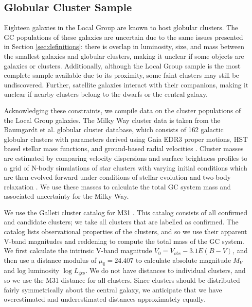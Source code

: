 \documentclass[twocolumn]{aastex631}
\begin{document}
\subsection{Globular Cluster Sample} \label{subsec:sample_clusters}

Eighteen galaxies in the Local Group are known to host globular clusters. The GC populations of these galaxies are uncertain due to the same issues presented in Section \ref{sec:definitions}: there is overlap in luminosity, size, and mass between the smallest galaxies and globular clusters, making it unclear if some objects are galaxies or clusters. Additionally, although the Local Group sample is the most complete sample available due to its proximity, some faint clusters may still be undiscovered. Further, satellite galaxies interact with their companions, making it unclear if nearby clusters belong to the dwarfs or the central galaxy.

Acknowledging these constraints, we compile data on the cluster populations of the Local Group galaxies. The Milky Way cluster data is taken from the Baumgardt et al. globular cluster database, which consists of 162 galactic globular clusters with parameters derived using Gaia EDR3 proper motions, HST based stellar mass functions, and ground-based radial velocities \citep{Baumgardt2017, Sollima2017, Baumgardt2018, Vasiliev2021}. Cluster masses are estimated by comparing velocity dispersions and surface brightness profiles to a grid of N-body simulations of star clusters with varying initial conditions which are then evolved forward under conditions of stellar evolution and two-body relaxation \citep{Baumgardt2017}. We use these masses to calculate the total GC system mass and associated uncertainty for the Milky Way.

We use the Galleti cluster catalog for M31 \citep{Galleti2004}. This catalog consists of all confirmed and candidate clusters; we take all clusters that are labelled as confirmed. The catalog lists observational properties of the clusters, and so we use their apparent V-band magnitudes and reddening to compute the total mass of the GC system. We first calculate the intrinsic V-band magnitude $V_0 = V_{obs} - 3.1E(B-V)$, and then use a distance modulus of $\mu_0=24.407$ \citep{Li2021} to calculate absolute magnitude $M_V$ and log luminosity $\log{L_{\textrm{gcs}}}$. We do not have distances to individual clusters, and so we use the M31 distance for all clusters. Since clusters should be distributed fairly symmetrically about the central galaxy, we anticipate that we have overestimated and underestimated distances approximately equally. 
\end{document}
